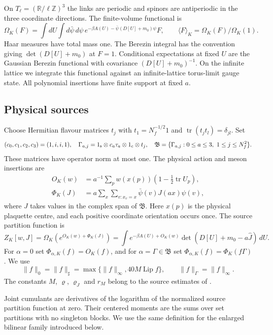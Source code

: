 \documentclass[11pt,letterpaper,reqno]{amsart}
\theoremstyle{definition}
\theoremstyle{remark}
\begin{document}
On $T_\ell=(\mathbb R/\ell\mathbb Z)^3$ the links are periodic
and spinors are antiperiodic in the three coordinate directions.
The finite-volume functional is
\[
 \Omega_K(F)=\int dU\int d\bar\psi\,d\psi\,
  e^{-\beta A(U)-\bar\psi(D[U]+m_0)\psi}F,
 \qquad \langle F\rangle_K=\Omega_K(F)/\Omega_K(1).
\]
Haar measures have total mass one. The Berezin integral has
the convention giving $\det(D[U]+m_0)$ at $F=1$.
Conditional expectations at fixed $U$ are the Gaussian
Berezin functional with covariance $(D[U]+m_0)^{-1}$.
On the infinite lattice we integrate this functional against
an infinite-lattice torus-limit gauge state. All polynomial
insertions have finite support at fixed $a$.

\subsection{Physical sources}

Choose Hermitian flavour matrices $t_j$ with
$t_1=N_f^{-1/2}1$ and
$\operatorname{tr}(t_jt_l)=\delta_{jl}$. Set
\[
 (c_0,c_1,c_2,c_3)=(1,i,i,1),\quad
 \Gamma_{a,j}=1_{\rm s}\otimes c_a\tau_a\otimes1_{\rm c}\otimes t_j,
 \quad\mathfrak B=\{\Gamma_{a,j}:0\le a\le3,\ 1\le j\le N_f^2\}.
\]
These matrices have operator norm at most one. The physical
action and meson insertions are
\begin{align}
 O_K(w)&=a^{-1}\sum_p w(x(p))
                     (1-\tfrac12\operatorname{tr}U_p),\label{eq:qcdm2-action}\\
 \Phi_K(J)&=a\sum_x\sum_{v:x_v=x}
                     \bar\psi(v)J(ax)\psi(v),\label{eq:qcdm2-meson}
\end{align}
where $J$ takes values in the complex span of $\mathfrak B$.
Here $x(p)$ is the physical plaquette centre, and each positive
coordinate orientation occurs once. The source partition
function is
\[
 Z_K[w,J]=\Omega_K(e^{O_K(w)+\Phi_K(J)})
 =\int e^{-\beta A(U)+O_K(w)}
     \det(D[U]+m_0-a\hat J)\,dU.
\]
For $\alpha=0$ set $\Phi_{\alpha,K}(f)=O_K(f)$, and for
$\alpha=\Gamma\in\mathfrak B$ set
$\Phi_{\alpha,K}(f)=\Phi_K(f\Gamma)$.
We use
\[
 \|f\|_0=\|f\|_\sharp
      =\max\{\|f\|_\infty,40M\operatorname{Lip}f\},
 \qquad\|f\|_\Gamma=\|f\|_\infty.
\]
The constants $M$, $\varrho$, $\varrho_J$ and $r_M$ belong
to the source estimates of \cite[\S10]{QCDM1}.

Joint cumulants are derivatives of the logarithm of the
normalized source partition function at zero. Their centered
moments are the sums over set partitions with no singleton
blocks. We use the same definition for the enlarged bilinear
family introduced below.
\end{document}
